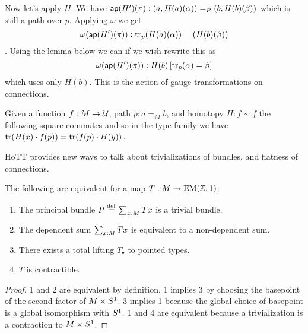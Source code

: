 Now let's apply \( H \). We have \( \mathsf{ap}(H')(\pi):(a,H(a)(\alpha))=_P(b,H(b)(\beta)) \) which is still a path over \( p \). Applying \( \omega \) we get \[ \omega(\mathsf{ap}(H')(\pi)):\mathrm{tr}_p(H(a)(\alpha))=(H(b)(\beta)) \]. Using the lemma below we can if we wish rewrite this as 
\[ 
\omega(\mathsf{ap}(H')(\pi)):H(b)\left[\mathrm{tr}_p(\alpha)=\beta\right]
\]
which uses only \( H(b) \). This is the action of gauge transformations on connections.

\begin{mylemma}
Given a function \( f:M\to\mathcal{U} \), path \( p:a=_M b \), and homotopy \( H:f\sim f \) the following square commutes and so in the type family we have \( \mathrm{tr}(H(x)\cdot f(p)) = \mathrm{tr}(f(p)\cdot H(y)) \).
\end{mylemma}
\begin{center}
\end{center}

HoTT provides new ways to talk about trivializations of bundles, and flatness of connections.

\begin{mythm}\label{thm:triv}
The following are equivalent for a map \( T:M\to\mathrm{EM}(\mathbb{Z},1) \):
\begin{enumerate}
\item The principal bundle \( P\stackrel{\mathrm{def}}{=}\sum_{x:M}Tx \) is a trivial bundle.
\item The dependent sum \( \sum_{x:M}Tx \) is equivalent to a non-dependent sum.
\item There exists a total lifting \( T_\bullet \) to pointed types.
\item \( T \) is contractible.
\end{enumerate}
\end{mythm}

\begin{proof}
1 and 2 are equivalent by definition. 1 implies 3 by choosing the basepoint of the second factor of \( M\times S^1 \). 3 implies 1 because the global choice of basepoint is a global isomorphism with \( S^1 \). 1 and 4 are equivalent because a trivialization is a contraction to \( M\times S^1 \).
\end{proof}

